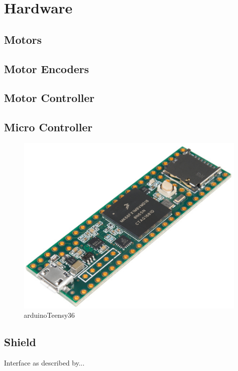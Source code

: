 \section{Hardware}

\subsection{Motors}


\subsection{Motor Encoders}


\subsection{Motor Controller}


\subsection{Micro Controller}


\begin{figure}[H]
  \includegraphics[width=.5\textwidth]{figures/arduinoTeensy36}
  \caption{arduinoTeensy36}
  \label{fig:arduinoTeensy36}
\end{figure}

\subsection{Shield}
Interface as described by... 
